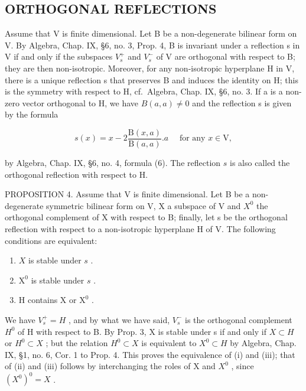 \subsection{ORTHOGONAL REFLECTIONS}

Assume that V is finite dimensional. Let B be a non-degenerate bilinear form on V. By Algebra, Chap. IX, §6, no. 3, Prop. 4, B is invariant under a reflection s in V if and only if the subspaces \(V_{s}^{+}\) and \(V_{s}^{-}\) of V are orthogonal with respect to B; they are then non-isotropic. Moreover, for any non-isotropic hyperplane H in V, there is a unique reflection s that preserves B and induces the identity on H; this is the symmetry with respect to H, cf.~Algebra, Chap. IX, §6, no. 3. If a is a non-zero vector orthogonal to H, we have \(B(a,a)\neq0\) and the reflection s is given by the formula

\[
s (x) = x - 2 \frac {\mathrm{B} (x , a)}{\mathrm{B} (a , a)}. a \quad \text { for   any } x \in \mathrm{V},\tag{4}
\]

by Algebra, Chap. IX, §6, no. 4, formula (6). The reflection \(s\) is also called the orthogonal reflection with respect to H.

PROPOSITION 4. Assume that V is finite dimensional. Let B be a non-degenerate symmetric bilinear form on V, X a subspace of V and \(X^{0}\) the orthogonal complement of X with respect to B; finally, let s be the orthogonal reflection with respect to a non-isotropic hyperplane H of V. The following conditions are equivalent:

\begin{enumerate}
\def\labelenumi{(\roman{enumi})}
\item
  \(X\) is stable under \(s\) .
\item
  \(\mathrm{X}^0\) is stable under \(s\) .
\item
  H contains X or \(\mathrm{X}^0\) .
\end{enumerate}

We have \(V_{s}^{+} = H\) , and by what we have said, \(V_{s}^{-}\) is the orthogonal complement \(H^{0}\) of H with respect to B. By Prop. 3, X is stable under s if and only if \(X \subset H\) or \(H^{0} \subset X\) ; but the relation \(H^{0} \subset X\) is equivalent to \(X^{0} \subset H\) by Algebra, Chap. IX, §1, no. 6, Cor. 1 to Prop. 4. This proves the equivalence of (i) and (iii); that of (ii) and (iii) follows by interchanging the roles of X and \(X^{0}\) , since \((X^{0})^{0} = X\) .

